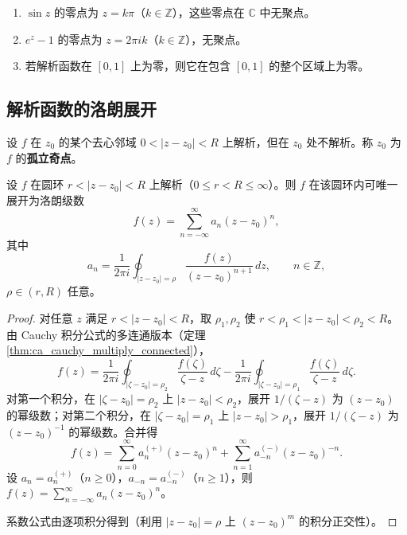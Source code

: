 \begin{example}[解析函数零点孤立性的应用]\label{ex:ca_zero_isolated_application}
\begin{enumerate}[label=(\roman*)]
    \item $\sin z$ 的零点为 $z = k\pi$（$k \in \mathbb{Z}$），这些零点在 $\mathbb{C}$ 中无聚点。
    \item $e^z - 1$ 的零点为 $z = 2\pi i k$（$k \in \mathbb{Z}$），无聚点。
    \item 若解析函数在 $[0, 1]$ 上为零，则它在包含 $[0, 1]$ 的整个区域上为零。
\end{enumerate}
\end{example}

\subsection{解析函数的洛朗展开}

\begin{definition}[孤立奇点]\label{def:ca_isolated_singularity}
设 $f$ 在 $z_0$ 的某个去心邻域 $0 < |z - z_0| < R$ 上解析，但在 $z_0$ 处不解析。称 $z_0$ 为 $f$ 的\textbf{孤立奇点}。
\end{definition}

\begin{theorem}[洛朗展开定理]\label{thm:ca_laurent_expansion}
设 $f$ 在圆环 $r < |z - z_0| < R$ 上解析（$0 \le r < R \le \infty$）。则 $f$ 在该圆环内可唯一展开为洛朗级数
\[
f(z) = \sum_{n=-\infty}^{\infty} a_n (z - z_0)^n,
\]
其中
\[
a_n = \frac{1}{2\pi i} \oint_{|z - z_0| = \rho} \frac{f(z)}{(z - z_0)^{n+1}} \, dz, \qquad n \in \mathbb{Z},
\]
$\rho \in (r, R)$ 任意。
\end{theorem}

\begin{proof}
对任意 $z$ 满足 $r < |z - z_0| < R$，取 $\rho_1, \rho_2$ 使 $r < \rho_1 < |z - z_0| < \rho_2 < R$。由 Cauchy 积分公式的多连通版本（定理 \ref{thm:ca_cauchy_multiply_connected}），
\[
f(z) = \frac{1}{2\pi i} \oint_{|\zeta - z_0| = \rho_2} \frac{f(\zeta)}{\zeta - z} \, d\zeta - \frac{1}{2\pi i} \oint_{|\zeta - z_0| = \rho_1} \frac{f(\zeta)}{\zeta - z} \, d\zeta.
\]
对第一个积分，在 $|\zeta - z_0| = \rho_2$ 上 $|z - z_0| < \rho_2$，展开 $1/(\zeta - z)$ 为 $(z - z_0)$ 的幂级数；对第二个积分，在 $|\zeta - z_0| = \rho_1$ 上 $|z - z_0| > \rho_1$，展开 $1/(\zeta - z)$ 为 $(z - z_0)^{-1}$ 的幂级数。合并得
\[
f(z) = \sum_{n=0}^{\infty} a_n^{(+)} (z - z_0)^n + \sum_{n=1}^{\infty} a_{-n}^{(-)} (z - z_0)^{-n}.
\]
设 $a_n = a_n^{(+)}$（$n \ge 0$），$a_{-n} = a_{-n}^{(-)}$（$n \ge 1$），则 $f(z) = \sum_{n=-\infty}^{\infty} a_n (z - z_0)^n$。

系数公式由逐项积分得到（利用 $|z - z_0| = \rho$ 上 $(z - z_0)^m$ 的积分正交性）。
\end{proof}

